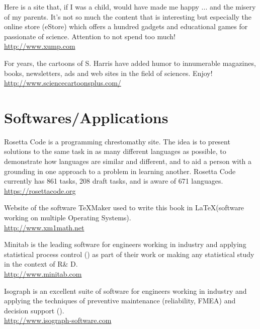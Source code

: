 	{\Large {}}{\Large {}} Here is a site that, if I was a child, would have made me happy ... and the misery of my parents. It's not so much the content that is interesting but especially the online store (eStore) which offers a hundred gadgets and educational games for passionate of science. Attention to not spend too much!\\
	\href{http://www.xump.com}{\color{blue}http://www.xump.com}
	
	{\Large {}}{\Large {}} For years, the cartoons of S. Harris have added humor to innumerable magazines, books, newsletters, ads and web sites in the field of sciences. Enjoy!\\
	\href{http://www.sciencecartoonsplus.com/}{\color{blue}http://www.sciencecartoonsplus.com/}
	
	\pagebreak
	\section{Softwares/Applications}
	{\Large {}}{\Large {}}{\Large {}} Rosetta Code is a programming chrestomathy site. The idea is to present solutions to the same task in as many different languages as possible, to demonstrate how languages are similar and different, and to aid a person with a grounding in one approach to a problem in learning another. Rosetta Code currently has 861 tasks, 208 draft tasks, and is aware of 671 languages.\\
	\href{https://rosettacode.org/wiki/Category:Programming_Tasks}{\color{blue}https://rosettacode.org}
	
	{\Large {}}{\Large {}}{\Large {}}{\Large {}} Website of the software TeXMaker used to write this book in \LaTeX (software working on multiple Operating Systems).\\
	\href{http://www.xm1math.net/texmaker/index.html}{\color{blue}http://www.xm1math.net}
	
	{\Large {}}{\Large {}}{\Large {}}{\Large {}} Minitab is the leading software for engineers working in industry and applying statistical process control () as part of their work or making any statistical study in the context of R\& D.\\
	\href{http://www.minitab.com}{\color{blue}http://www.minitab.com}
	
	{\Large {}}{\Large {}}{\Large {}}{\Large {}} Isograph is an excellent suite of software for engineers working in industry and applying the techniques of preventive maintenance (reliability, FMEA) and decision support ().\\
	\href{http://www.isograph-software.com}{\color{blue}http://www.isograph-software.com}
	
